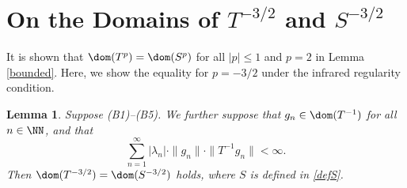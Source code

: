 \documentclass[12pt]{article}
\theoremstyle{plain}
\newtheorem{lem}[theorem]{\bf Lemma}
\numberwithin{equation}{section}
\theoremstyle{remark}
\begin{document}
\section{On the Domains of $T^{-3/2}$ and $S^{-3/2}$}

It is shown that $\dom(T^{p})=\dom(S^{p})$ for all $|p|\leq 1$ and $p=2$ in Lemma \ref{bounded}.
Here, we show the equality for $p=-3/2$ under the infrared regularity condition.

\begin{lem}\label{domain-3/2}
Suppose (B1)--(B5).
We further suppose that $g_n\in\dom(T^{-1})$ for all $n\in\NN$, and that
\[
\sum_{n=1}^{\infty}|\lambda_n|\cdot\|g_n\|\cdot\|T^{-1}g_n\|<\infty.
\]
Then $\dom(T^{-3/2})=\dom(S^{-3/2})$ holds, where $S$ is defined in \eqref{defS}.
\end{lem}
\end{document}
